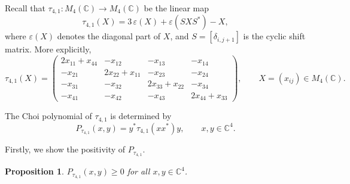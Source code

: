 \documentclass[12pt,a4paper]{amsart}
\theoremstyle{plain}
\newtheorem{proposition}[theorem]{Proposition}
\theoremstyle{remark}
\theoremstyle{definition}
\begin{document}
Recall that $\tau_{4,1}:M_4(\mathbb C)\to M_4(\mathbb C)$ be the linear map
\[
\tau_{4,1}(X)=3\,\varepsilon(X)+\varepsilon(SXS^*)-X,
\]
where $\varepsilon(X)$ denotes the diagonal part of $X$, and $S=[\delta_{i,j+1}]$ is the cyclic shift matrix.
More explicitly,   
\[
\tau_{4,1}(X)=
\begin{pmatrix}
2x_{11}+x_{44} & -x_{12} & -x_{13} & -x_{14}\\
-x_{21} & 2x_{22}+x_{11} & -x_{23} & -x_{24}\\
-x_{31} & -x_{32} & 2x_{33}+x_{22} & -x_{34}\\
-x_{41} & -x_{42} & -x_{43} & 2x_{44}+x_{33}
\end{pmatrix},
\qquad X=(x_{ij})\in M_4(\mathbb C).
\]


 The Choi polynomial of $\tau_{4,1}$ is determined by
\[
P_{\tau_{4,1}}(x,y)=y^*\tau_{4,1}(xx^*)y,
\qquad x,y\in \mathbb C^4.
\]

Firstly, we show the positivity of $P_{\tau_{4,1}}$.


\begin{proposition} $ P_{\tau_{4,1}}(x,y)\ge 0 $  for all $x,y\in\mathbb C^4$.
\end{proposition}
\end{document}
